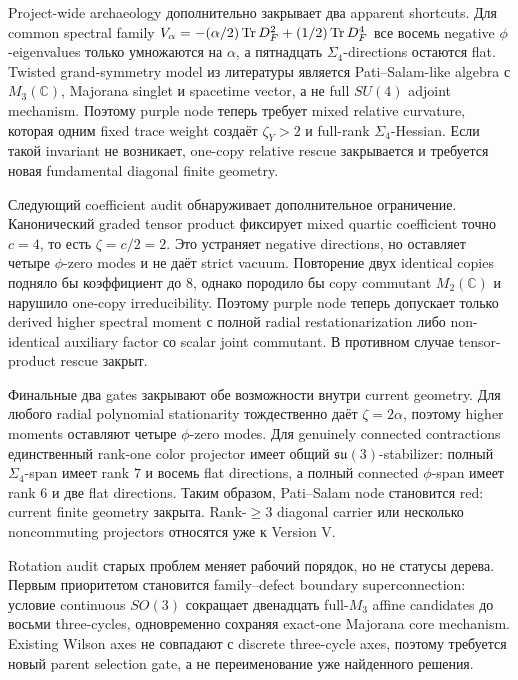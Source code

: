 Project-wide archaeology дополнительно закрывает два apparent shortcuts.
Для common spectral family
\(V_\alpha=-(\alpha/2)\operatorname{Tr} D_F^2+(1/2)\operatorname{Tr} D_F^4\) все восемь negative
\(\phi\)-eigenvalues только умножаются на \(\alpha\), а пятнадцать
\(\Sigma_4\)-directions остаются flat. Twisted grand-symmetry model из
литературы является Pati--Salam-like algebra с \(M_3(\mathbb C)\),
Majorana singlet и spacetime vector, а не full \(SU(4)\) adjoint mechanism.
Поэтому purple node теперь требует mixed relative curvature, которая одним
fixed trace weight создаёт \(\zeta_Y>2\) и full-rank
\(\Sigma_4\)-Hessian. Если такой invariant не возникает, one-copy relative
rescue закрывается и требуется новая fundamental diagonal finite geometry.

Следующий coefficient audit обнаруживает дополнительное ограничение.
Канонический graded tensor product фиксирует mixed quartic coefficient
точно \(c=4\), то есть \(\zeta=c/2=2\). Это устраняет negative directions,
но оставляет четыре \(\phi\)-zero modes и не даёт strict vacuum. Повторение
двух identical copies подняло бы коэффициент до \(8\), однако породило бы
copy commutant \(M_2(\mathbb C)\) и нарушило one-copy irreducibility.
Поэтому purple node теперь допускает только derived higher spectral moment
с полной radial restationarization либо non-identical auxiliary factor со
scalar joint commutant. В противном случае tensor-product rescue закрыт.

Финальные два gates закрывают обе возможности внутри current geometry.
Для любого radial polynomial stationarity тождественно даёт
\(\zeta=2\alpha\), поэтому higher moments оставляют четыре
\(\phi\)-zero modes. Для genuinely connected contractions единственный
rank-one color projector имеет общий \(\mathfrak{su}(3)\)-stabilizer:
полный \(\Sigma_4\)-span имеет rank \(7\) и восемь flat directions, а
полный connected \(\phi\)-span имеет rank \(6\) и две flat directions.
Таким образом, Pati--Salam node становится red: current finite geometry
закрыта. Rank-\(\ge3\) diagonal carrier или несколько noncommuting
projectors относятся уже к Version V.

Rotation audit старых проблем меняет рабочий порядок, но не статусы дерева.
Первым приоритетом становится family--defect boundary superconnection:
условие continuous \(SO(3)\) сокращает двенадцать full-\(M_3\) affine
candidates до восьми three-cycles, одновременно сохраняя exact-one
Majorana core mechanism. Existing Wilson axes не совпадают с discrete
three-cycle axes, поэтому требуется новый parent selection gate, а не
переименование уже найденного решения.

